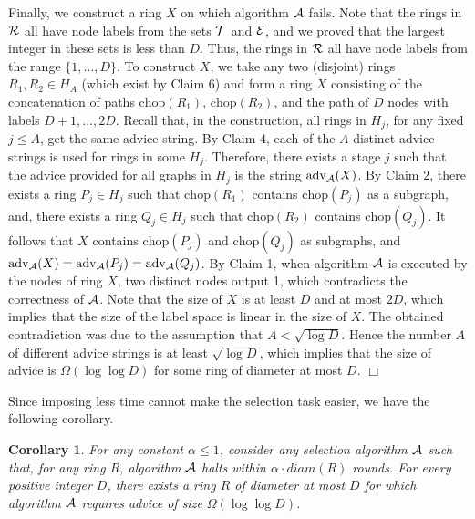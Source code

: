 \documentclass[11pt]{article}
\newtheorem{corollary}{Corollary}[section]
\newcommand{\qed}{\hfill $\Box$ \bigbreak}
\newenvironment{proof}{\noindent {\bf Proof.}}{\qed}
\newcommand{\algname}{\ensuremath{{\cal A}}}
\newcommand{\diam}[1]{\ensuremath{{diam}(#1)}}
\newcommand{\chop}[1]{\ensuremath{\mathrm{chop}(#1)}}
\newcommand{\advice}[1]{\ensuremath{\mathrm{adv}_{\algname}(#1)}}
\begin{document}
\begin{proof}
Finally, we construct a ring $X$ on which algorithm $\algname$ fails. Note that the rings in ${\cal R}$ all have node labels from the sets ${\cal T}$ and ${\cal E}$, and we proved that the largest integer in these sets is less than $D$. Thus, the rings in ${\cal R}$ all have node labels from  the range $\{1,\ldots, D\}$. To construct $X$, we take any two (disjoint) rings $R_1,R_2 \in H_A$ (which exist by Claim 6) and form a ring $X$ consisting of the concatenation of paths $\chop{R_1}$, $\chop{R_2}$, and the path of $D$ nodes with labels $D+1,\ldots,2D$. Recall that, in the construction, all rings in $H_j$, for any fixed $j \leq A$, get the same advice string.   
By Claim 4, each of the $A$ distinct advice strings is used for rings in some $H_j$. Therefore, there exists a stage $j$ such that the advice provided for all graphs in $H_j$ is the string $\advice{X}$. By Claim 2, there exists a ring $P_j \in H_j$ such that $\chop{R_1}$ contains $\chop{P_j}$ as a subgraph, and, there exists a ring $Q_j \in H_j$ such that $\chop{R_2}$ contains $\chop{Q_j}$. It follows that $X$ contains $\chop{P_j}$ and $\chop{Q_j}$ as subgraphs, and $\advice{X} = \advice{P_j} = \advice{Q_j}$. By Claim 1, when algorithm $\algname$ is executed by the nodes of ring $X$, two distinct nodes output 1, which contradicts the correctness of $\algname$. Note that the size of $X$ is at least $D$ and at most $2D$, which implies that the size of the label space is linear in the size of $X$. The obtained contradiction was due to the assumption that $A < \sqrt{\log D}$. Hence the number $A$ of different advice strings is at least $\sqrt{\log D}$, which implies that the size of advice is
$\Omega (\log\log D)$ for some ring of diameter at most $D$.
\end{proof}

Since imposing less time cannot make the selection task easier, we have the following corollary.

\begin{corollary}\label{cor}
For any constant $\alpha \leq 1$,
consider any selection algorithm $\algname$ such that, for any ring $R$, algorithm $\algname$ halts within $\alpha \cdot \diam{R}$ rounds.  For every positive integer $D$, there exists a ring $R$ of diameter at most $D$ for which algorithm $\algname$ requires advice of size $\Omega(\log\log D)$.
\end{corollary}
\end{document}
